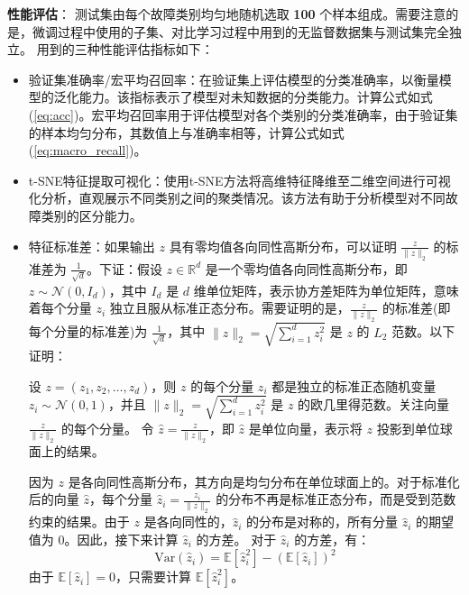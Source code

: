 \documentclass[master]{thesis-uestc}
\begin{document}
\textbf{性能评估}：  
    测试集由每个故障类别均匀地随机选取 \textbf{100} 个样本组成。需要注意的是，微调过程中使用的子集、对比学习过程中用到的无监督数据集与测试集完全独立。  
    用到的三种性能评估指标如下：

    \begin{itemize}
        \item 验证集准确率/宏平均召回率：在验证集上评估模型的分类准确率，以衡量模型的泛化能力。该指标表示了模型对未知数据的分类能力。计算公式如式(\ref{eq:acc})。宏平均召回率用于评估模型对各个类别的分类准确率，由于验证集的样本均匀分布，其数值上与准确率相等，计算公式如式(\ref{eq:macro_recall})。
        
        \item t-SNE特征提取可视化：使用t-SNE方法将高维特征降维至二维空间进行可视化分析，直观展示不同类别之间的聚类情况。该方法有助于分析模型对不同故障类别的区分能力。
        \item 特征标准差：如果输出 \( z \) 具有零均值各向同性高斯分布，可以证明 \( \frac{z}{\|z\|_2} \) 的标准差为 \( \frac{1}{\sqrt{d}} \)。下证：假设 \( z \in \mathbb{R}^d \) 是一个零均值各向同性高斯分布，即 \( z \sim \mathcal{N}(0, I_d) \)，其中 \( I_d \) 是 \( d \) 维单位矩阵，表示协方差矩阵为单位矩阵，意味着每个分量 \( z_i \) 独立且服从标准正态分布。需要证明的是，\( \frac{z}{\|z\|_2} \) 的标准差(即每个分量的标准差)为 \( \frac{1}{\sqrt{d}} \)，其中 \( \|z\|_2 = \sqrt{\sum_{i=1}^{d} z_i^2} \) 是 \( z \) 的 \( L_2 \) 范数。以下证明：

        设 \( z = (z_1, z_2, \dots, z_d) \)，则 \( z \) 的每个分量 \( z_i \) 都是独立的标准正态随机变量 \( z_i \sim \mathcal{N}(0, 1) \)，并且 \( \|z\|_2 = \sqrt{\sum_{i=1}^{d} z_i^2} \) 是 \( z \) 的欧几里得范数。关注向量 \( \frac{z}{\|z\|_2} \) 的每个分量。
        令 \( \hat{z} = \frac{z}{\|z\|_2} \)，即 \( \hat{z} \) 是单位向量，表示将 \( z \) 投影到单位球面上的结果。
    
        因为 \( z \) 是各向同性高斯分布，其方向是均匀分布在单位球面上的。对于标准化后的向量 \( \hat{z} \)，每个分量 \( \hat{z}_i = \frac{z_i}{\|z\|_2} \) 的分布不再是标准正态分布，而是受到范数约束的结果。由于 \( z \) 是各向同性的，\( \hat{z}_i \) 的分布是对称的，所有分量 \( \hat{z}_i \) 的期望值为 0。因此，接下来计算 \( \hat{z}_i \) 的方差。
        对于 \( \hat{z}_i \) 的方差，有：
        \begin{equation}
        \text{Var}(\hat{z}_i) = \mathbb{E}[\hat{z}_i^2] - (\mathbb{E}[\hat{z}_i])^2
        \end{equation}
        由于 \( \mathbb{E}[\hat{z}_i] = 0 \)，只需要计算 \( \mathbb{E}[\hat{z}_i^2] \)。
    

\end{itemize}
\end{document}
